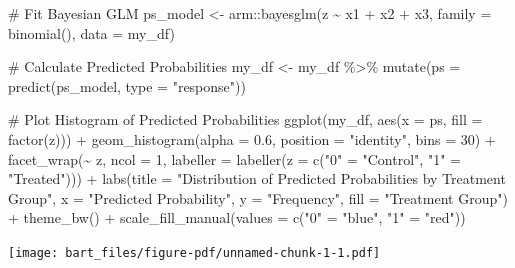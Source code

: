 \documentclass[
  letterpaper,
  DIV=11,
  numbers=noendperiod]{scrreprt}
\newenvironment{Shaded}{\begin{snugshade}}{\end{snugshade}}
\newcommand{\AttributeTok}[1]{\textcolor[rgb]{0.40,0.45,0.13}{#1}}
\newcommand{\CommentTok}[1]{\textcolor[rgb]{0.37,0.37,0.37}{#1}}
\newcommand{\DecValTok}[1]{\textcolor[rgb]{0.68,0.00,0.00}{#1}}
\newcommand{\FloatTok}[1]{\textcolor[rgb]{0.68,0.00,0.00}{#1}}
\newcommand{\FunctionTok}[1]{\textcolor[rgb]{0.28,0.35,0.67}{#1}}
\newcommand{\NormalTok}[1]{\textcolor[rgb]{0.00,0.23,0.31}{#1}}
\newcommand{\OtherTok}[1]{\textcolor[rgb]{0.00,0.23,0.31}{#1}}
\newcommand{\SpecialCharTok}[1]{\textcolor[rgb]{0.37,0.37,0.37}{#1}}
\newcommand{\StringTok}[1]{\textcolor[rgb]{0.13,0.47,0.30}{#1}}
\begin{document}
\begin{Shaded}
\begin{Highlighting}[]
\CommentTok{\# Fit Bayesian GLM}
\NormalTok{ps\_model }\OtherTok{\textless{}{-}}\NormalTok{ arm}\SpecialCharTok{::}\FunctionTok{bayesglm}\NormalTok{(z }\SpecialCharTok{\textasciitilde{}}\NormalTok{ x1 }\SpecialCharTok{+}\NormalTok{ x2 }\SpecialCharTok{+}\NormalTok{ x3,}
                    \AttributeTok{family =} \FunctionTok{binomial}\NormalTok{(),}
                    \AttributeTok{data =}\NormalTok{ my\_df)}

\CommentTok{\# Calculate Predicted Probabilities}
\NormalTok{my\_df }\OtherTok{\textless{}{-}}\NormalTok{ my\_df }\SpecialCharTok{\%\textgreater{}\%}
  \FunctionTok{mutate}\NormalTok{(}\AttributeTok{ps =} \FunctionTok{predict}\NormalTok{(ps\_model, }\AttributeTok{type =} \StringTok{"response"}\NormalTok{))}

\CommentTok{\# Plot Histogram of Predicted Probabilities}
\FunctionTok{ggplot}\NormalTok{(my\_df, }\FunctionTok{aes}\NormalTok{(}\AttributeTok{x =}\NormalTok{ ps, }\AttributeTok{fill =} \FunctionTok{factor}\NormalTok{(z))) }\SpecialCharTok{+}
  \FunctionTok{geom\_histogram}\NormalTok{(}\AttributeTok{alpha =} \FloatTok{0.6}\NormalTok{, }\AttributeTok{position =} \StringTok{"identity"}\NormalTok{, }\AttributeTok{bins =} \DecValTok{30}\NormalTok{) }\SpecialCharTok{+}  
  \FunctionTok{facet\_wrap}\NormalTok{(}\SpecialCharTok{\textasciitilde{}}\NormalTok{ z, }\AttributeTok{ncol =} \DecValTok{1}\NormalTok{, }\AttributeTok{labeller =} \FunctionTok{labeller}\NormalTok{(}\AttributeTok{z =} \FunctionTok{c}\NormalTok{(}\StringTok{"0"} \OtherTok{=} \StringTok{"Control"}\NormalTok{, }\StringTok{"1"} \OtherTok{=} \StringTok{"Treated"}\NormalTok{))) }\SpecialCharTok{+} 
  \FunctionTok{labs}\NormalTok{(}\AttributeTok{title =} \StringTok{"Distribution of Predicted Probabilities by Treatment Group"}\NormalTok{,}
       \AttributeTok{x =} \StringTok{"Predicted Probability"}\NormalTok{, }
       \AttributeTok{y =} \StringTok{"Frequency"}\NormalTok{,}
       \AttributeTok{fill =} \StringTok{"Treatment Group"}\NormalTok{) }\SpecialCharTok{+}
  \FunctionTok{theme\_bw}\NormalTok{() }\SpecialCharTok{+}
  \FunctionTok{scale\_fill\_manual}\NormalTok{(}\AttributeTok{values =} \FunctionTok{c}\NormalTok{(}\StringTok{"0"} \OtherTok{=} \StringTok{"blue"}\NormalTok{, }\StringTok{"1"} \OtherTok{=} \StringTok{"red"}\NormalTok{))}
\end{Highlighting}
\end{Shaded}

\texttt{[image: bart\_files/figure-pdf/unnamed-chunk-1-1.pdf]}
\end{document}
